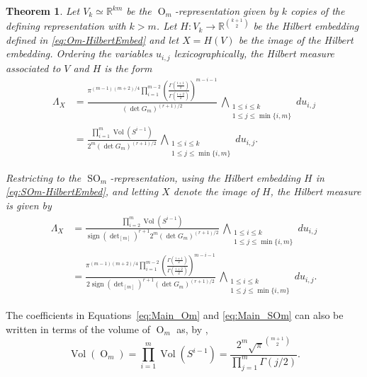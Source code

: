 \documentclass[twoside]{amsart}
\newtheorem{mainthm}{Theorem}
\theoremstyle{definition}
\theoremstyle{remark}
\numberwithin{equation}{section}
\newcommand{\R}{\mathbb{R}}
\newcommand{\OO}{\operatorname{O}}
\newcommand{\SO}{\operatorname{SO}}
\newcommand{\Vol}{\operatorname{Vol}}
\newcommand{\sign}{\operatorname{sign}}
\begin{document}
\begin{mainthm}
\label{mainthm:Om-SOm}
Let $V_k \simeq\R^{km}$ be the $\OO_m$-representation given by $k$ copies of the defining representation with $k > m$.
Let $H\colon V_k\to\R^{{k+1\choose 2}}$ be the Hilbert embedding defined in \eqref{eq:Om-HilbertEmbed}
and let $X = H(V)$ be the image of the Hilbert embedding. Ordering the variables $u_{i,j}$ lexicographically,
the Hilbert measure associated to $V$ and $H$ is the form
\begin{equation}
\label{eq:Main_Om}
\begin{aligned}
    \Lambda_X
    &=
    \frac{ \pi^{(m-1)(m+2)/4}
            \prod\limits_{i=1}^{m-2} \left( \frac{ \Gamma\left(\frac{i+1}{2}\right) }{ \Gamma\left(\frac{i+2}{2}\right)} \right)^{m-i-1} }
        {(\det G_m)^{(r+1)/2}}
        \, \bigwedge\limits_{\substack{1\leq i\leq k \\ 1\leq j \leq {\min\{i,m\}} }}  du_{i,j}
    \\&=
    \frac{ \prod\limits_{i=1}^m \Vol(S^{i-1}) }{2^m (\det G_m)^{(r+1)/2}}
        \, \bigwedge\limits_{\substack{1\leq i\leq k \\ 1\leq j \leq {\min\{i,m\}} }}  du_{i,j}.
\end{aligned}
\end{equation}

Restricting to the $\SO_m$-representation, using the Hilbert embedding $H$ in \eqref{eq:SOm-HilbertEmbed}, and letting $X$ denote the image of $H$,
the Hilbert measure is given by
\begin{equation}
\label{eq:Main_SOm}
\begin{split}
    \Lambda_X &=
    \frac{ \prod\limits_{i=2}^m \Vol(S^{i-1}) }{\sign(\det\nolimits_{[m]})^{r+1} 2^m (\det G_m)^{(r+1)/2}}
        \, \bigwedge\limits_{\substack{1\leq i\leq k \\ 1\leq j \leq {\min\{i,m\}} }}  du_{i,j}
    \\&=
    \frac{ \pi^{(m-1)(m+2)/4}
        \prod\limits_{i=1}^{m-2} \left( \frac{ \Gamma\left(\frac{i+1}{2}\right) }{ \Gamma\left(\frac{i+2}{2}\right)} \right)^{m-i-1} }
        {2\sign(\det\nolimits_{[m]})^{r+1} (\det G_m)^{(r+1)/2}}
        \, \bigwedge\limits_{\substack{1\leq i\leq k \\ 1\leq j \leq {\min\{i,m\}} }}  du_{i,j}.
\end{split}
\end{equation}
\end{mainthm}

The coefficients in Equations~\eqref{eq:Main_Om} and \eqref{eq:Main_SOm} can also be written in terms of the volume of $\OO_m$ as,
by \cite[Thrm.~2.24]{ZhangVolumes},
\[
    \Vol(\OO_m)
        =   \prod\limits_{i=1}^m \Vol(S^{i-1})
        =   \frac{2^m \sqrt{\pi}^{m+1\choose 2} }{\prod_{j=1}^m \Gamma(j/2) }.
\]
\end{document}
